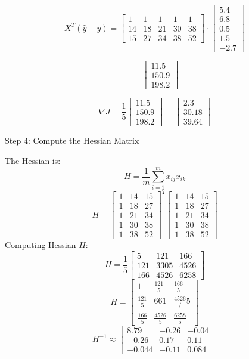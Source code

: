 \documentclass[12pt]{article}
\theoremstyle{definition}
\begin{document}
\[
X^T (\hat{y} - y) =
\begin{bmatrix}
1 & 1 & 1 & 1 & 1 \\
14 & 18 & 21 & 30 & 38 \\
15 & 27 & 34 & 38 & 52
\end{bmatrix}
\cdot
\begin{bmatrix} 5.4 \\ 6.8 \\ 0.5 \\ 1.5 \\ -2.7 \end{bmatrix}
\]

\[
=
\begin{bmatrix}
11.5 \\
150.9 \\
198.2
\end{bmatrix}
\]

\[
\nabla J = \frac{1}{5} \begin{bmatrix} 11.5 \\150.9 \\198.2 \end{bmatrix} =
\begin{bmatrix} 2.3 \\ 30.18 \\ 39.64 \end{bmatrix}
\]

Step 4: Compute the Hessian Matrix

The Hessian is:
\[
H = \frac{1}{m} \sum_{i=1}^{m} x_{ij} x_{ik}
\]
\[
H =
\begin{bmatrix}
1 & 14 & 15 \\
1 & 18 & 27 \\
1 & 21 & 34 \\
1 & 30 & 38 \\
1 & 38 & 52
\end{bmatrix}^T
\begin{bmatrix}
1 & 14 & 15 \\
1 & 18 & 27 \\
1 & 21 & 34 \\
1 & 30 & 38 \\
1 & 38 & 52
\end{bmatrix}
\]
Computing Hessian \( H \):
\[
H =
\frac{1}{5}
\begin{bmatrix}
5 & 121 & 166 \\
121 & 3305 & 4526 \\
166 & 4526 & 6258
\end{bmatrix}
\]
\[
H =
\begin{bmatrix}
1 & \frac{121}{5} & \frac{166}{5} \\
\frac{121}{5} & 661 & \frac{4526}/5 \\
\frac{166}{5} & \frac{4526}{5} & \frac{6258}{5}
\end{bmatrix}
\]
\[
H^{-1} \approx
\begin{bmatrix}
8.79 & -0.26 & -0.04 \\
-0.26 & 0.17 & 0.11 \\
-0.044 & -0.11 & 0.084
\end{bmatrix}
\]
\end{document}
